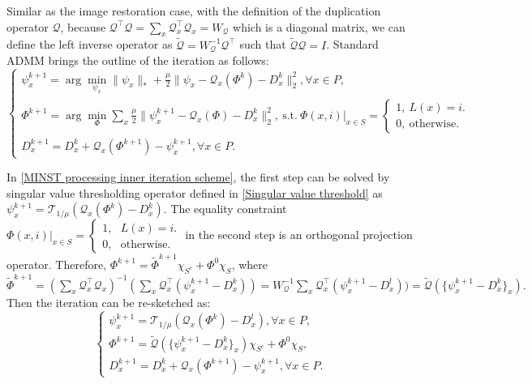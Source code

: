\documentclass[letterpaper,10pt]{article}
\begin{document}
Similar as the image restoration case, with the definition of the duplication operator $\mathcal{Q}$, because $\mathcal{Q}^{\top}\mathcal{Q} = \sum_{x} \mathcal{Q}_x^{\top}\mathcal{Q}_x = W_{\mathcal{Q}}$ which is a diagonal matrix, we can define the left inverse operator as $\tilde{\mathcal{Q}} = W_{\mathcal{Q}}^{-1} \mathcal{Q}^{\top}$ such that $\tilde{\mathcal{Q}}\mathcal{Q} = I$. Standard ADMM brings the outline of the iteration as follows:
\begin{equation}\label{MINST processing inner iteration scheme}
\begin{cases}
\psi_x^{k+1} = \arg\min_{\psi_x}  \|\psi_x\|_* +\frac{\mu}{2}\|{\psi_x} - \mathcal{Q}_x (\Phi^{k}) -D_{x}^{k}\|_2^2 , \forall x \in P,\\
{\Phi}^{k+1} = \arg\min_\Phi \sum_{x} \frac{\mu}{2}\|{\psi_x^{k+1}} - \mathcal{Q}_x (\Phi) -D_{x}^{k}\|_2^2, ~ \text{s.t.} ~ \Phi(x,i)|_{x \in S} = \begin{cases}1,   \ L(x) = i.\\0, \ \text{otherwise}. \end{cases}\\
D_x^{k+1} = D_x^k + \mathcal{Q}_x (\Phi^{k+1}) - \psi_x^{k+1}, \forall x \in P.
\end{cases}
\end{equation}

In \eqref{MINST processing inner iteration scheme}, the first step can be solved by singular value thresholding operator defined in \eqref{Singular value threshold} as $\psi_x^{k+1} = \mathcal{T}_{1/\mu}(\mathcal{Q}_x (\Phi^{k}) -D_{x}^{k})$. The equality constraint $ \Phi(x,i)|_{x \in S} = \begin{cases}1,  \ \ \ L(x) = i.\\0, \ \ \ \text{otherwise}. \end{cases}$ in the second step is an orthogonal projection operator. Therefore, ${\Phi}^{k+1} = \tilde{\Phi}^{k+1} \chi_{S^c} + \Phi^0 \chi_{S}$, where $\tilde{\Phi}^{k+1} =  (\sum_{x} \mathcal{Q}_x^{\top} \mathcal{Q}_x)^{-1} (\sum_{x} \mathcal{Q}_x^{\top}({\psi_x^{k+1}} - D_{x}^{k})) = W_{{\mathcal{Q}}}^{-1}\sum_{x} \mathcal{Q}_x^{\top}({\psi_x^{k+1}} - D_{x}^{l})) = \tilde{\mathcal{Q}} (\{\psi_x^{k+1}-D_{x}^k\}_x).$ Then the iteration can be re-sketched as:
\begin{equation}\label{MINST processing inner iteration scheme resc}
\begin{cases}
\psi_x^{k+1} = \mathcal{T}_{1/\mu}(\mathcal{Q}_x (\Phi^{k}) -D_{x}^{l}) , \forall x \in P,\\
{\Phi}^{k+1} =  \tilde{\mathcal{Q}} (\{\psi_x^{k+1}-D_{x}^k\}_x) \chi_{S^c} + \Phi^0 \chi_{S},\\
D_x^{k+1} = D_x^k + \mathcal{Q}_x (\Phi^{k+1}) - \psi_x^{k+1}, \forall x \in P.
\end{cases}
\end{equation}
\end{document}
